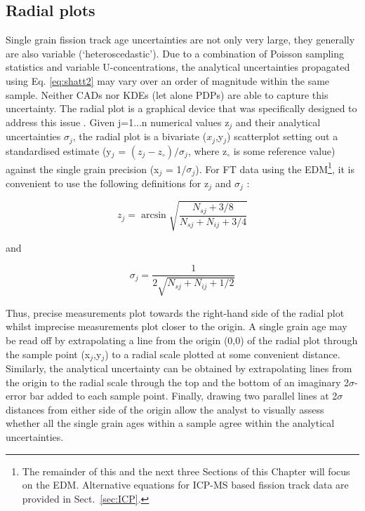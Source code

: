 \documentclass{article}
\begin{document}
\subsection{Radial plots}

Single grain fission track age uncertainties are not only very large,
they generally are also variable (`heteroscedastic'). Due to a
combination of Poisson sampling statistics and variable
U-concentrations, the analytical uncertainties propagated using
Eq. \ref{eq:shatt2} may vary over an order of magnitude within the
same sample. Neither CADs nor KDEs (let alone PDPs) are able to
capture this uncertainty.  The radial plot is a graphical device that
was specifically designed to address this issue
\citep{galbraith1988,galbraith1990a,dunkl2002,vermeesch2009c}. Given
j=1...n numerical values z$_j$ and their analytical uncertainties
$\sigma_j$, the radial plot is a bivariate ($x_j$,y$_j$) scatterplot
setting out a standardised estimate (y$_j$ = $(z_j-z_\circ)/\sigma_j$,
where z$_\circ$ is some reference value) against the single grain
precision (x$_j$ = 1/$\sigma_j$).  For FT data using the
EDM\footnote{The remainder of this and the next three Sections of this
  Chapter will focus on the EDM.  Alternative equations for ICP-MS
  based fission track data are provided in Sect.~\ref{sec:ICP}.}, it
is convenient to use the following definitions for z$_j$ and
$\sigma_j$ \citep{galbraith1990a}:

\begin{equation}
z_j = \arcsin\sqrt{\frac{N_{sj} + 3/8}{N_{sj}+N_{ij}+3/4}}
\label{eq:zj}
\end{equation}

and

\begin{equation}
\sigma_j = \frac{1}{2\sqrt{N_{sj}+N_{ij}+1/2}}
\label{eq:sj}
\end{equation}

Thus, precise measurements plot towards the right-hand side of the
radial plot whilst imprecise measurements plot closer to the origin.
A single grain age may be read off by extrapolating a line from the
origin (0,0) of the radial plot through the sample point (x$_j$,y$_j$)
to a radial scale plotted at some convenient distance.  Similarly, the
analytical uncertainty can be obtained by extrapolating lines from the
origin to the radial scale through the top and the bottom of an
imaginary 2$\sigma$-error bar added to each sample point.  Finally,
drawing two parallel lines at 2$\sigma$ distances from either side of
the origin allow the analyst to visually assess whether all the single
grain ages within a sample agree within the analytical
uncertainties.\\
\end{document}
